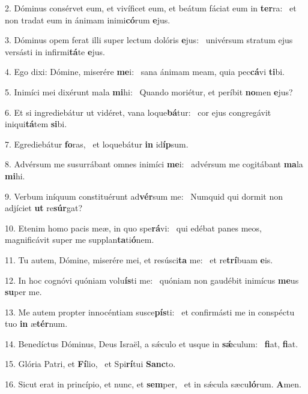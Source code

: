 2. Dóminus consérvet eum, et vivíficet eum, et beátum fáciat eum in \textbf{ter}ra: \ast\  et non tradat eum in ánimam inimi\textbf{có}rum \textbf{e}jus.\

3. Dóminus opem ferat illi super lectum dolóris \textbf{e}jus: \ast\  univérsum stratum ejus versásti in infirmi\textbf{tá}te \textbf{e}jus.\

4. Ego dixi: Dómine, miserére \textbf{me}i: \ast\  sana ánimam meam, quia pec\textbf{cá}vi \textbf{ti}bi.\

5. Inimíci mei dixérunt mala \textbf{mi}hi: \ast\  Quando moriétur, et períbit \textbf{no}men \textbf{e}jus?\

6. Et si ingrediebátur ut vidéret, vana loque\textbf{bá}tur: \ast\  cor ejus congregávit iniqui\textbf{tá}tem \textbf{si}bi.\

7. Egrediebátur \textbf{fo}ras, \ast\  et loquebátur \textbf{in} id\textbf{íp}sum.\

8. Advérsum me susurrábant omnes inimíci \textbf{me}i: \ast\  advérsum me cogitábant \textbf{ma}la \textbf{mi}hi.\

9. Verbum iníquum constituérunt ad\textbf{vér}sum me: \ast\  Numquid qui dormit non adjíciet \textbf{ut} re\textbf{súr}gat?\

10. Etenim homo pacis meæ, in quo spe\textbf{rá}vi: \ast\  qui edébat panes meos, magnificávit super me supplan\textbf{ta}ti\textbf{ó}nem.\

11. Tu autem, Dómine, miserére mei, et resúsci\textbf{ta} me: \ast\  et re\textbf{trí}buam \textbf{e}is.\

12. In hoc cognóvi quóniam volu\textbf{ís}ti me: \ast\  quóniam non gaudébit inimícus \textbf{me}us \textbf{su}per me.\

13. Me autem propter innocéntiam susce\textbf{pís}ti: \ast\  et confirmásti me in conspéctu tuo \textbf{in} æ\textbf{tér}num.\

14. Benedíctus Dóminus, Deus Israël, a sǽculo et usque in \textbf{sǽ}culum: \ast\  \textbf{fi}at, \textbf{fi}at.\

15. Glória Patri, et \textbf{Fí}lio, \ast\  et Spi\textbf{rí}tui \textbf{Sanc}to.\

16. Sicut erat in princípio, et nunc, et \textbf{sem}per, \ast\  et in sǽcula sæcu\textbf{ló}rum. \textbf{A}men.\

